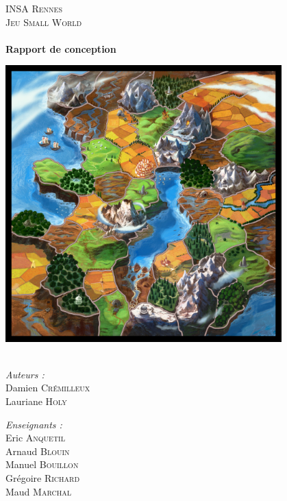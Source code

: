 \begin{titlepage}
\begin{center}


\textsc{\LARGE INSA Rennes}\\[1.5cm]

\textsc{\Large Jeu Small World}\\[0.5cm]

\HRule \\[0.4cm]
{ \huge \bfseries Rapport de conception \\[0.4cm] }

\includegraphics[width=0.8\textwidth]{./images/plateau_smallworld.jpg}~\\[1cm]


\HRule \\[1.5cm]

\begin{minipage}{0.4\textwidth}
\begin{flushleft} \large
\emph{Auteurs :}\\
Damien \textsc{Crémilleux}\\
Lauriane \textsc{Holy}\\
\end{flushleft}
\end{minipage}
\begin{minipage}{0.4\textwidth}
\begin{flushright} \large
\emph{Enseignants :} \\
Eric \textsc{Anquetil}\\
Arnaud \textsc{Blouin}\\
Manuel \textsc{Bouillon}\\
Grégoire \textsc{Richard}\\
Maud \textsc{Marchal}\\
\end{flushright}
\end{minipage}

\vfill


\end{center}
\end{titlepage}